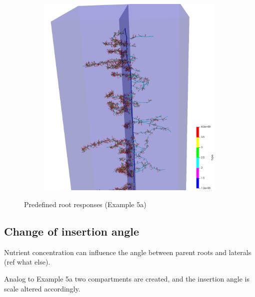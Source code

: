 \begin{figure}
\begin{subfigure}[c]{0.3\textwidth}
 \label{fig:insertion}
\end{subfigure}
\begin{subfigure}[c]{0.3\textwidth}
\includegraphics[width=0.99\textwidth]{example5d.png}
 \label{fig:probability}
\end{subfigure}
\caption{Predefined root responses (Example 5a)}
\end{figure}



\subsection{Change of insertion angle} \label{sec:insertion_angle}

Nutrient concentration can influence the angle between parent roots and laterals (ref what else).

Analog to Example 5a two compartments are created, and the insertion angle is scale altered accordingly.



